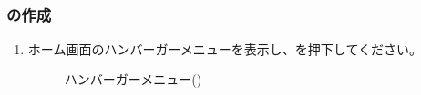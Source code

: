 \subsection{\playlist}
    \subsubsection{\playlist の作成}
        \begin{enumerate}
            \item ホーム画面のハンバーガーメニューを表示し、を押下してください。
                \begin{figure}[htbp]
                    \centering
                    \caption{ハンバーガーメニュー(\currentVersion)}
                    \label{img:playlist1}
                \end{figure}


\end{enumerate}
